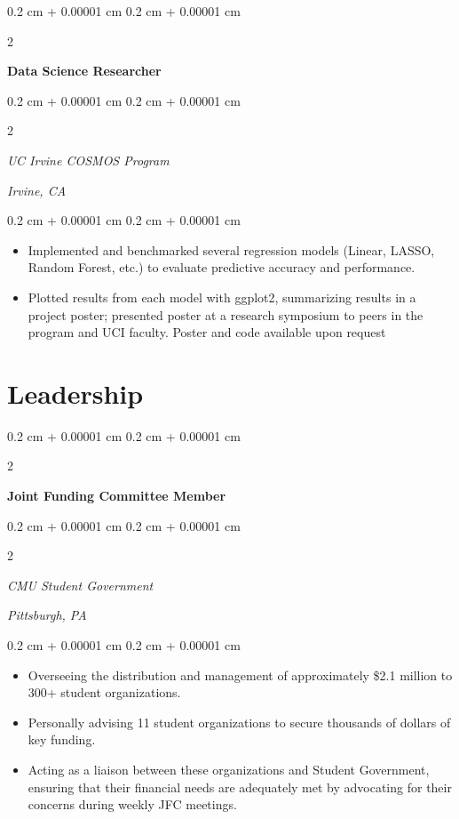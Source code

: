 \documentclass[10pt, letterpaper]{article}
\newenvironment{highlights}{
    \begin{itemize}[
        topsep=0.10 cm,
        parsep=0.10 cm,
        partopsep=0pt,
        itemsep=0pt,
        leftmargin=0.4 cm + 10pt
    ]
}{
    \end{itemize}
} %
\newenvironment{onecolentry}{
    \begin{adjustwidth}{
        0.2 cm + 0.00001 cm
    }{
        0.2 cm + 0.00001 cm
    }
}{
    \end{adjustwidth}
} %
\newenvironment{twocolentry}[2][]{
    \onecolentry
    \def\secondColumn{#2}
    \setcolumnwidth{\fill, 4.5 cm}
    \begin{paracol}{2}
}{
    \switchcolumn \raggedleft \secondColumn
    \end{paracol}
    \endonecolentry
} %
\begin{document}
        \vspace{0.2 cm}
        
        \begin{twocolentry}{
        }
            \textbf{Data Science Researcher}
        \end{twocolentry}
        \begin{twocolentry}{
            \textit{Irvine, CA}}
            \textit{UC Irvine COSMOS Program}
        \end{twocolentry}

        \vspace{0.10 cm}
        \begin{onecolentry}
            \begin{highlights}
                \item Implemented and benchmarked several regression models (Linear, LASSO, Random Forest, etc.) to evaluate predictive accuracy and performance.
                \item Plotted results from each model with ggplot2, summarizing results in a project poster; presented poster at a research symposium to peers in the program and UCI faculty.  Poster and code available upon request
            \end{highlights}
        \end{onecolentry}

    \section{Leadership}
        \begin{twocolentry}{
            }
            \textbf{Joint Funding Committee Member}
        \end{twocolentry}
        \begin{twocolentry}{
            \textit{Pittsburgh, PA}}
            \textit{CMU Student Government}
        \end{twocolentry}

        \vspace{0.10 cm}
        \begin{onecolentry}
            \begin{highlights}
                \item Overseeing the distribution and management of approximately \$2.1 million to 300+ student organizations.
                \item Personally advising 11 student organizations to secure thousands of dollars of key funding.
                \item Acting as a liaison between these organizations and Student Government, ensuring that their financial needs are adequately met by advocating for their concerns during weekly JFC meetings.
            \end{highlights}
        \end{onecolentry}
\end{document}
